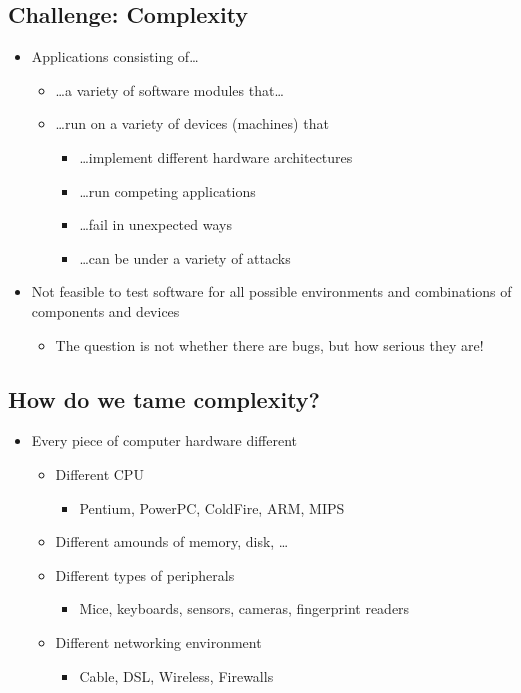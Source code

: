 \documentclass{article}
\begin{document}
\subsection{Challenge: Complexity}
\begin{itemize}
\item Applications consisting of\dots
\begin{itemize}
\item \dots a variety of software modules that\dots
\item \dots run on a variety of devices (machines) that
\begin{itemize}
\item \dots implement different hardware architectures
\item \dots run competing applications
\item \dots fail in unexpected ways
\item \dots can be under a variety of attacks
\end{itemize}
\end{itemize}
\item Not feasible to test software for all possible environments and combinations of components and devices
\begin{itemize}
\item The question is not whether there are bugs, but how serious they are!
\end{itemize}
\end{itemize}
\subsection{How do we tame complexity?}
\begin{itemize}
\item Every piece of computer hardware different
\begin{itemize}
\item Different CPU
\begin{itemize}
\item Pentium, PowerPC, ColdFire, ARM, MIPS
\end{itemize}
\item Different amounds of memory, disk, \dots
\item Different types of peripherals
\begin{itemize}
\item Mice, keyboards, sensors, cameras, fingerprint readers
\end{itemize}
\item Different networking environment
\begin{itemize}
\item Cable, DSL, Wireless, Firewalls
\end{itemize}
\end{itemize}
\end{itemize}
\end{document}
